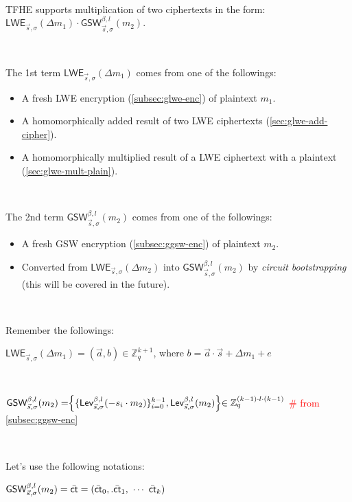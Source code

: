 $ $

TFHE supports multiplication of two ciphertexts in the form: $\textsf{LWE}_{\vec{s}, \sigma}(\Delta m_1) \cdot \textsf{GSW}_{\vec{s}, \sigma}^{\beta, l}(m_2)$. 

$ $

\noindent The 1st term $\textsf{LWE}_{\vec{s}, \sigma}(\Delta m_1)$ comes from one of the followings: 
\begin{itemize}
\item A fresh LWE encryption (\autoref{subsec:glwe-enc}) of plaintext $m_1$. 
\item A homomorphically added result of two LWE ciphertexts (\autoref{sec:glwe-add-cipher}). 
\item A homomorphically multiplied result of a LWE ciphertext with a plaintext (\autoref{sec:glwe-mult-plain}). 
\end{itemize}

$ $

\noindent The 2nd term $\textsf{GSW}_{\vec{s}, \sigma}^{\beta, l}(m_2)$ comes from one of the followings:
\begin{itemize}
\item A fresh GSW encryption (\autoref{subsec:ggsw-enc}) of plaintext $m_2$.
\item Converted from $\textsf{LWE}_{\vec{s}, \sigma}(\Delta m_2)$ into $\textsf{GSW}_{\vec{s}, \sigma}^{\beta, l}(m_2)$ by \textit{circuit bootstrapping} (this will be covered in the future).
\end{itemize}

$ $

\noindent Remember the followings: 

$\textsf{LWE}_{\vec{s}, \sigma}(\Delta m_1) = (\vec{a}, b) \in \mathbb{Z}_{q}^{k + 1}$, where $b = \vec{a} \cdot \vec{s} + \Delta m_1 + e$ 

$ $

$\textsf{GSW}_{\vec{s}, \sigma}^{\beta, l}(m_2) = \Bigr \{ \{ \textsf{Lev}_{\vec{s}, \sigma}^{\beta, l} (-s_i \cdot m_2)  \}_{i=0}^{k-1}, \textsf{Lev}_{\vec{s}, \sigma}^{\beta, l}(m_2) \Bigl \} \in \mathbb{Z}_{q }^{(k-1) \cdot l \cdot (k-1)}$ \textcolor{red}{\# from \autoref{subsec:ggsw-enc}}

$ $

\noindent Let's use the following notations:

$\textsf{GSW}_{\vec{s}, \sigma}^{\beta, l}(m_2) = {\bar{\textsf{ct}}} = (\bar{\textsf{ct}}_0,. \bar{\textsf{ct}}_1, \text{ } \text{$\cdots$} \text{ } \bar{\textsf{ct}}_k)$ 

